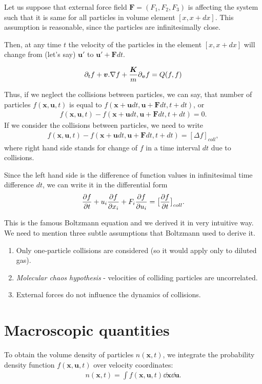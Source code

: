Let us suppose that external force field $\bm{F} = (F_1, F_2, F_3)$ is affecting the system such that it is same for all particles in volume element $[x, x+ dx]$. This assumption is reasonable, since the particles are infinitesimally close.

Then, at any time $t$ the velocity of the particles in the element $[x, x + dx]$ will change from (let's say) $\bm{u'}$ to $\bm{u'} + \bm{F}dt$.

\begin{align*}
\partial_t f + \bm{v}.\nabla f + \frac{\bm{K}}{m}\partial_{\bm{v}} f = Q(f,f)
\end{align*}

Thus, if we neglect the collisions between particles, we can say, that number of particles 
$f(\bm{x}, \bm{u}, t)$ is equal to $f(\bm{x + u}dt, \bm{u + F}dt, t + dt)$, or 
\begin{align*}
f(\bm{x}, \bm{u}, t) - f(\bm{x + u}dt, \bm{u + F}dt, t + dt) = 0.
\end{align*}
If we consider the collisions between particles, we need to write
\begin{align*}
f(\bm{x}, \bm{u}, t) - f(\bm{x + u}dt, \bm{u + F}dt, t + dt) = [\Delta f]_{coll},
\end{align*}
where right hand side stands for change of $f$ in a time interval $dt$ due to collisions.

Since the left hand side is the difference of function values in infinitesimal time difference $dt$, we can write it in the differential form
\begin{align} \label{BoltzmannE}
\frac{\partial f}{\partial t} + u_i \frac{\partial f}{\partial x_i} + F_i \frac{\partial f}{\partial u_i} = \big[\frac{\partial f}{\partial t} \big]_{coll}.
\end{align}

This is the famous Boltzmann equation and we derived it in very intuitive way. We need to mention three subtle assumptions that Boltzmann used to derive it.
\begin{enumerate}
\item Only one-particle collisions are considered (so it would apply only to diluted gas).
\item \textit{Molecular chaos hypothesis} - velocities of colliding particles are uncorrelated.
\item External forces do not influence the dynamics of collisions.
\end{enumerate}

\section{Macroscopic quantities}
To obtain the volume density of particles $n(\bm{x},t)$, we integrate the probability density function $f(\bm{x},\bm{u},t)$ over velocity coordinates:
\begin{align*}
n(\bm{x},t) = \int f(\bm{x,u},t) \dd \bm{x} \dd \bm{u}.
\end{align*}

